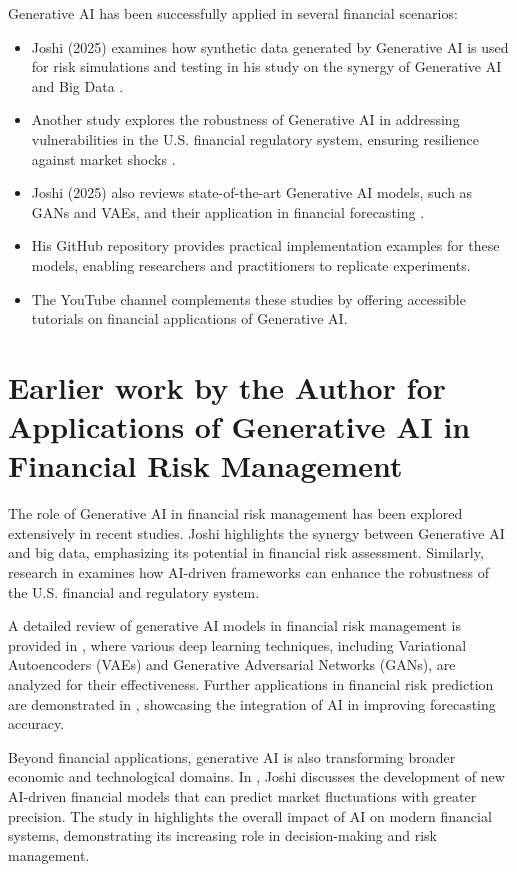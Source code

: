 \documentclass[a4paper,headinclude=on,footinclude=on,12pt,oneside]{scrbook}
\begin{document}
Generative AI has been successfully applied in several financial scenarios:
\begin{itemize}
	\item Joshi (2025) examines how synthetic data generated by Generative AI is used for risk simulations and testing in his study on the synergy of Generative AI and Big Data \cite{JoshiIJFMR2025}.
	\item Another study explores the robustness of Generative AI in addressing vulnerabilities in the U.S. financial regulatory system, ensuring resilience against market shocks \cite{JoshiIJIREM2025}.
	\item Joshi (2025) also reviews state-of-the-art Generative AI models, such as GANs and VAEs, and their application in financial forecasting \cite{JoshiCSEIT2025}.
	\item His GitHub repository \cite{JoshiGit2025} provides practical implementation examples for these models, enabling researchers and practitioners to replicate experiments.
	\item The YouTube channel \cite{JoshiYouTube2025} complements these studies by offering accessible tutorials on financial applications of Generative AI.
\end{itemize}


\section{Earlier work by the Author for Applications of Generative AI in Financial Risk Management}

The role of Generative AI in financial risk management has been explored extensively in recent studies. Joshi \cite{JoshiIJFMR2025} highlights the synergy between Generative AI and big data, emphasizing its potential in financial risk assessment. Similarly, research in \cite{JoshiIJIREM2025} examines how AI-driven frameworks can enhance the robustness of the U.S. financial and regulatory system.

A detailed review of generative AI models in financial risk management is provided in \cite{JoshiCSEIT2025}, where various deep learning techniques, including Variational Autoencoders (VAEs) and Generative Adversarial Networks (GANs), are analyzed for their effectiveness. Further applications in financial risk prediction are demonstrated in \cite{JoshiIRJET2025}, showcasing the integration of AI in improving forecasting accuracy.

Beyond financial applications, generative AI is also transforming broader economic and technological domains. In \cite{JoshiIJMEF2025}, Joshi discusses the development of new AI-driven financial models that can predict market fluctuations with greater precision. The study in \cite{JoshiIJMS2025} highlights the overall impact of AI on modern financial systems, demonstrating its increasing role in decision-making and risk management.
\end{document}
